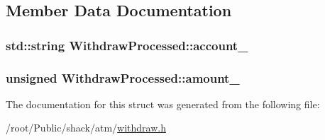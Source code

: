 \subsection{Member Data Documentation}
\hypertarget{structWithdrawProcessed_afa3ac4805902cdbc81215c07d004fe38}{
\subsubsection[{account\-\_\-}]{\setlength{\rightskip}{0pt plus 5cm}std\-::string Withdraw\-Processed\-::account\-\_\-}}\label{structWithdrawProcessed_afa3ac4805902cdbc81215c07d004fe38}
\hypertarget{structWithdrawProcessed_ad80c4901e941fb58a74c1b116abcf467}{
\subsubsection[{amount\-\_\-}]{\setlength{\rightskip}{0pt plus 5cm}unsigned Withdraw\-Processed\-::amount\-\_\-}}\label{structWithdrawProcessed_ad80c4901e941fb58a74c1b116abcf467}


The documentation for this struct was generated from the following file\-:\begin{DoxyCompactItemize}
\item 
/root/\-Public/shack/atm/\hyperlink{withdraw_8h}{withdraw.\-h}\end{DoxyCompactItemize}
